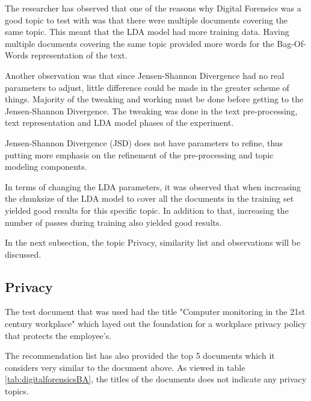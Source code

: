 The researcher has observed that one of the reasons why Digital Forensics was a good topic to test with was that there were multiple documents covering the same topic. This meant that the LDA model had more training data. Having multiple documents covering the same topic provided more words for the Bag-Of-Words representation of the text.

Another observation was that since Jensen-Shannon Divergence had no real parameters to adjust, little difference could be made in the greater scheme of things. Majority of the tweaking and working must be done before getting to the Jensen-Shannon Divergence. The tweaking was done in the text pre-processing, text representation and LDA model phases of the experiment.

\begin{lesson}
Jensen-Shannon Divergence (JSD) does not have parameters to refine, thus putting more emphasis on the refinement of the pre-processing and topic modeling components.
\end{lesson}\label{L:JSD}

In terms of changing the LDA parameters, it was observed that when increasing the chunksize of the LDA model to cover all the documents in the training set yielded good results for this specific topic. In addition to that, increasing the number of passes during training also yielded good results.

In the next subsection, the topic Privacy, similarity list and observations will be discussed.
\subsection{Privacy}
The test document that was used had the title "Computer monitoring in the 21st century workplace" which layed out the foundation for a workplace privacy policy that protects the employee's.

The recommendation list has also provided the top 5 documents which it considers very similar to the document above. As viewed in table \ref{tab:digitalforensicsBA}, the titles of the documents does not indicate any privacy topics.


